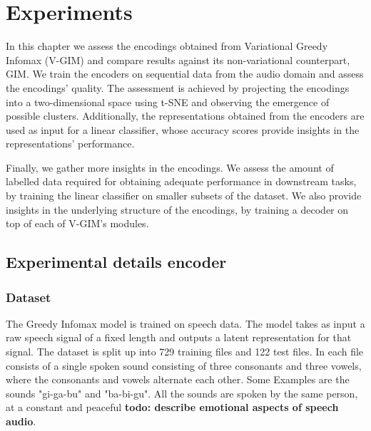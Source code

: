 \chapter{Experiments}

In this chapter we assess the encodings obtained from Variational Greedy Infomax (V-GIM) and compare results against its non-variational counterpart, GIM. We train the encoders on sequential data from the audio domain and assess the encodings' quality. The assessment is achieved by projecting the encodings into a two-dimensional space using t-SNE and observing the emergence of possible clusters. Additionally, the representations obtained from the encoders are used as input for a linear classifier, whose accuracy scores provide insights in the representations' performance.

Finally, we gather more insights in the encodings. We assess the amount of labelled data required for obtaining adequate performance in downstream tasks, by training the linear classifier on smaller subsets of the dataset. We also provide insights in the underlying structure of the encodings, by training a decoder on top of each of V-GIM's modules.


%	

	







\section{Experimental details encoder}

	
	
	\subsection{Dataset}
		The Greedy Infomax model is trained on speech data. The model takes as input a raw speech signal of a fixed length and outputs a latent representation for that signal. The dataset is split up into 729 training files and 122 test files. In each file consists of a single spoken sound consisting of three consonants and three vowels, where the consonants and vowels alternate each other. Some Examples are the sounds "gi-ga-bu" and "ba-bi-gu". All the sounds are spoken by the same person, at a constant and peaceful \textbf{todo: describe emotional aspects of speech audio}. 
		

